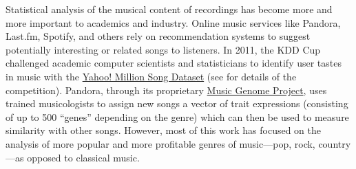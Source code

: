 \documentclass[aoas]{imsart}
\newcommand{\attn}[1]{\textcolor{red}{Note: #1}}
\begin{document}

Statistical analysis of the musical content of recordings has
become more and more important to academics and industry. Online
music services like Pandora, Last.fm, Spotify, and others rely on
recommendation systems to suggest potentially interesting or related
songs to listeners. In 2011, the KDD Cup challenged academic computer
scientists and statisticians to identify user tastes in music with the
\href{http://labrosa.ee.columbia.edu/millionsong/}{Yahoo! Million
  Song Dataset} (see \citet{DrorKoenigstein2012} for details of the
competition). Pandora, through its proprietary
\href{https://www.pandora.com/about/mgp}{Music Genome Project}, uses
trained musicologists to assign new songs a vector of trait
expressions (consisting of up to 500 ``genes'' depending on the genre)
which can then be used to measure similarity with other
songs. However, most of this work has focused on the analysis of more popular
and more profitable genres of music---pop, rock, country---as opposed
to classical music. 
\end{document}
